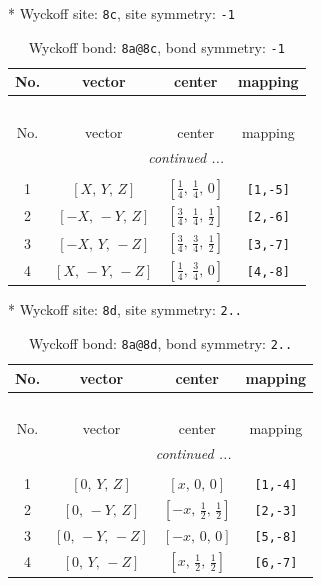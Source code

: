 \documentclass[fleqn,8pt]{jsarticle}
\begin{document}
* Wyckoff site: {\tt 8c}, site symmetry: {\tt -1}
\renewcommand{\arraystretch}{1.2}
\begin{longtable}{cccc}
\caption{Wyckoff bond: {\tt 8a@8c}, bond symmetry: {\tt -1}}
 \\
 \hline \hline
No. & vector & center & mapping \\ \hline \endfirsthead

\multicolumn{3}{l}{\tablename\ \thetable{}} \\
 \hline \hline
No. & vector & center & mapping \\ \hline \endhead

 \hline \hline
\multicolumn{3}{r}{\footnotesize\it continued ...} \\ \endfoot

 \hline \hline
\multicolumn{3}{r}{} \\ \endlastfoot

1 & $\left[ X,\, Y,\, Z \right]$ & $\left[ \frac{1}{4},\, \frac{1}{4},\, 0 \right]$ & {\tt [1,-5]} \\ \hline
2 & $\left[ - X,\, - Y,\, Z \right]$ & $\left[ \frac{3}{4},\, \frac{1}{4},\, \frac{1}{2} \right]$ & {\tt [2,-6]} \\ \hline
3 & $\left[ - X,\, Y,\, - Z \right]$ & $\left[ \frac{3}{4},\, \frac{3}{4},\, \frac{1}{2} \right]$ & {\tt [3,-7]} \\ \hline
4 & $\left[ X,\, - Y,\, - Z \right]$ & $\left[ \frac{1}{4},\, \frac{3}{4},\, 0 \right]$ & {\tt [4,-8]} \\
\end{longtable}
* Wyckoff site: {\tt 8d}, site symmetry: {\tt 2..}
\renewcommand{\arraystretch}{1.2}
\begin{longtable}{cccc}
\caption{Wyckoff bond: {\tt 8a@8d}, bond symmetry: {\tt 2..}}
 \\
 \hline \hline
No. & vector & center & mapping \\ \hline \endfirsthead

\multicolumn{3}{l}{\tablename\ \thetable{}} \\
 \hline \hline
No. & vector & center & mapping \\ \hline \endhead

 \hline \hline
\multicolumn{3}{r}{\footnotesize\it continued ...} \\ \endfoot

 \hline \hline
\multicolumn{3}{r}{} \\ \endlastfoot

1 & $\left[ 0,\, Y,\, Z \right]$ & $\left[ x,\, 0,\, 0 \right]$ & {\tt [1,-4]} \\ \hline
2 & $\left[ 0,\, - Y,\, Z \right]$ & $\left[ - x,\, \frac{1}{2},\, \frac{1}{2} \right]$ & {\tt [2,-3]} \\ \hline
3 & $\left[ 0,\, - Y,\, - Z \right]$ & $\left[ - x,\, 0,\, 0 \right]$ & {\tt [5,-8]} \\ \hline
4 & $\left[ 0,\, Y,\, - Z \right]$ & $\left[ x,\, \frac{1}{2},\, \frac{1}{2} \right]$ & {\tt [6,-7]} \\
\end{longtable}
\end{document}
